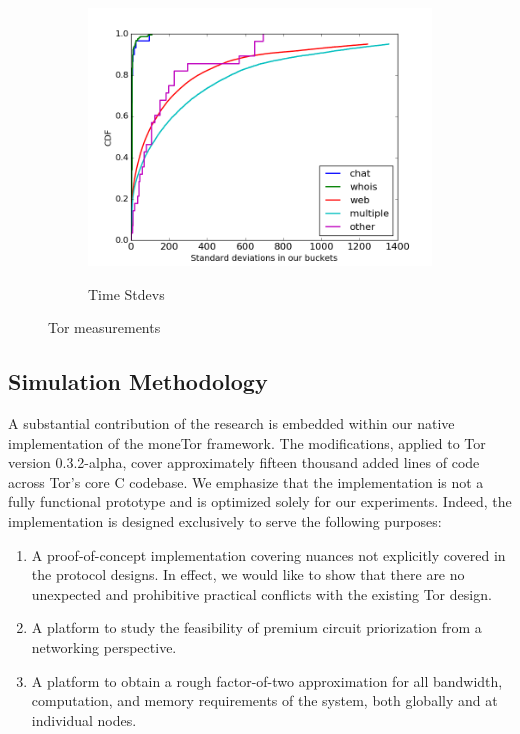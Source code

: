 \begin{figure}
\begin{subfigure}[t]{0.32\textwidth}
\includegraphics[scale=0.3]{images/stddevs.png}
		\label{fig:stats_c}
		\caption{Time Stdevs}
	\end{subfigure}
	\label{fig:measurements}
	\caption{Tor measurements}
\end{figure}

\subsection{Simulation Methodology}

A substantial contribution of the research is embedded within our native
implementation of the moneTor framework. The modifications, applied to Tor
version 0.3.2-alpha, cover approximately fifteen thousand added lines of code
across Tor's core C codebase. We emphasize that the implementation is not a
fully functional prototype and is optimized solely for our experiments. Indeed,
the implementation is designed exclusively to serve the following purposes:

\begin{enumerate}
\item A proof-of-concept implementation covering nuances not explicitly
  covered in the protocol designs. In effect, we would like to show that there
  are no unexpected and prohibitive practical conflicts with the existing Tor
  design.
\item A platform to study the feasibility of premium circuit
  priorization from a networking perspective.
\item A platform to obtain a rough factor-of-two approximation for all
  bandwidth, computation, and memory requirements of the system, both globally
  and at individual nodes.
\end{enumerate}

